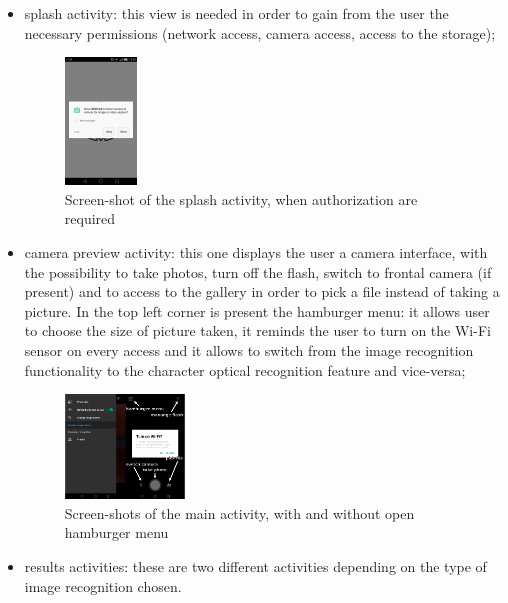 \begin{itemize}
  \item splash activity: this view is needed in order to gain from the user
    the necessary permissions (network access, camera access, access to
    the storage);
    \begin{figure}[h]
        \centering
        \includegraphics[width=0.18\textwidth]{../img/splash}
        \caption{Screen-shot of the splash activity, when authorization are 
                 required}
        \label{fig:splash}
    \end{figure}
  \item camera preview activity: this one displays the user a camera
    interface, with the possibility to take photos, turn off the flash, switch
    to frontal camera (if present) and to access to the gallery in order to
    pick a file instead of taking a picture. In the top left corner is present
    the hamburger menu: it allows user to choose the size of picture taken,
    it reminds the user to turn on the Wi-Fi sensor on every access and it
    allows to switch from the image recognition functionality to the
    character optical recognition feature and vice-versa;
    \begin{figure}[h]
        \centering
        \includegraphics[width=0.30\textwidth]{../img/main_activity}
        \caption{Screen-shots of the main activity, with and without open 
                 hamburger menu}
        \label{fig:mainActivity}
    \end{figure}
  \item results activities: these are two different activities depending on
        the type of image recognition chosen.
    \begin{itemize}

\end{itemize}
\end{itemize}
